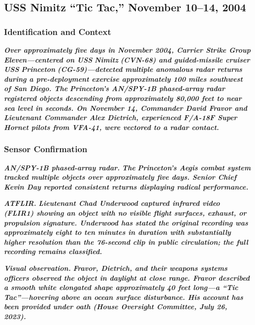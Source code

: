 \documentclass[11pt,letterpaper]{article}
\begin{document}
\subsection{USS Nimitz ``Tic Tac,'' November 10--14, 2004}

\subsubsection{Identification and Context}

\textbf{\textit{Over approximately five days in November 2004, Carrier Strike Group Eleven---centered on USS }}\textbf{\textit{Nimitz}}\textbf{\textit{ (CVN-68) and guided-missile cruiser USS }}\textbf{\textit{Princeton}}\textbf{\textit{ (CG-59)---detected multiple anomalous radar returns during a pre-deployment exercise approximately 100 miles southwest of San Diego. The }}\textbf{\textit{Princeton}}\textbf{\textit{'s AN/SPY-1B phased-array radar registered objects descending from approximately 80,000 feet to near sea level in seconds. On November 14, Commander David Fravor and Lieutenant Commander Alex Dietrich, experienced F/A-18F Super Hornet pilots from VFA-41, were vectored to a radar contact.}}


\subsubsection{Sensor Confirmation}

\textbf{\textit{AN/SPY-1B phased-array radar.}}\textbf{\textit{ The }}\textbf{\textit{Princeton}}\textbf{\textit{'s Aegis combat system tracked multiple objects over approximately five days. Senior Chief Kevin Day reported consistent returns displaying radical performance.}}


\textbf{\textit{ATFLIR.}}\textbf{\textit{ Lieutenant Chad Underwood captured infrared video (FLIR1) showing an object with no visible flight surfaces, exhaust, or propulsion signature. Underwood has stated the original recording was approximately eight to ten minutes in duration with substantially higher resolution than the 76-second clip in public circulation; the full recording remains classified.}}


\textbf{\textit{Visual observation.}}\textbf{\textit{ Fravor, Dietrich, and their weapons systems officers observed the object in daylight at close range. Fravor described a smooth white elongated shape approximately 40 feet long---a ``Tic Tac''---hovering above an ocean surface disturbance. His account has been provided under oath (House Oversight Committee, July 26, 2023).}}
\end{document}
